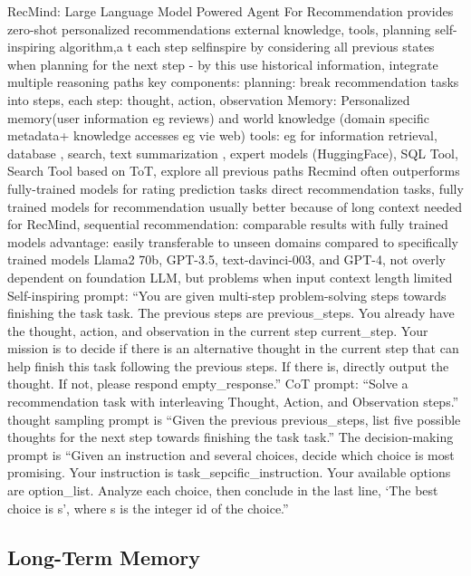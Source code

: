 \documentclass{article}
\begin{document}
\cite{wang_recmind_2024} RecMind: Large Language Model Powered Agent For Recommendation
provides zero-shot personalized recommendations
external knowledge, tools, planning
self-inspiring algorithm,a t each step selfinspire  by considering all previous states when planning for the next step - by this use historical information, integrate multiple reasoning paths
key components:
planning: break recommendation tasks into steps, each step: thought, action, observation
Memory: Personalized memory(user information eg reviews) and world knowledge (domain specific metadata+  knowledge accesses eg vie web)
tools: eg for information retrieval, database , search, text summarization
, expert models (HuggingFace), SQL Tool, Search Tool
based on ToT, explore all previous paths
Recmind often outperforms fully-trained models for rating prediction tasks
direct recommendation tasks, fully trained models for recommendation usually better because of long context needed for RecMind, sequential recommendation: comparable results with fully trained models
advantage: easily transferable to unseen domains compared to specifically trained models
Llama2 70b, GPT-3.5, text-davinci-003, and GPT-4, not overly dependent on foundation LLM, but problems when input context length limited
Self-inspiring prompt: 
“You are given multi-step problem-solving steps towards finishing the task {task}. The previous steps are {previous\_steps}. You already have the thought, action, and observation in the current step {current\_step}. Your mission is to decide if there is an alternative thought in the current step that can help finish this task following the previous steps. If there is, directly output the thought. If not, please respond {empty\_response}.”
CoT prompt: “Solve a recommendation task with interleaving Thought, Action, and Observation steps.”
thought sampling prompt is “Given the previous {previous\_steps}, list five possible thoughts for the next step towards finishing the task {task}.” The decision-making prompt is “Given an instruction and several choices, decide which choice is most promising. Your instruction is {task\_sepcific\_instruction}. Your available options are {option\_list}. Analyze each choice, then conclude in the last line, ‘The best choice is {s}’, where s is the integer id of the choice.”



\subsection{Long-Term Memory}
\end{document}
